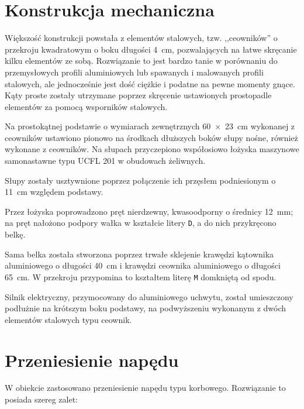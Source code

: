 \section{Konstrukcja mechaniczna}

Większość konstrukcji powstała z elementów stalowych, tzw. ,,ceowników'' o przekroju kwadratowym o boku długości \SI[mode=text]{4}{cm}, pozwalających na łatwe skręcanie kilku elementów ze sobą. Rozwiązanie to jest bardzo tanie w porównaniu do przemysłowych profili aluminiowych lub spawanych i malowanych profili stalowych, ale jednocześnie jest dość ciężkie i podatne na pewne momenty gnące. Kąty proste zostały utrzymane poprzez skręcenie ustawionych prostopadle elementów za pomocą wsporników stalowych.


Na prostokątnej podstawie o wymiarach zewnętrznych \SI[mode=text]{60 x 23}{cm} wykonanej z ceowników ustawiono pionowo na środkach dłuższych boków słupy nośne, również wykonane z ceowników. Na słupach przyczepiono współosiowo łożyska maszynowe samonastawne typu UCFL 201 w obudowach żeliwnych.

Słupy zostały usztywnione poprzez połączenie ich przęsłem podniesionym o \SI[mode=text]{11}{cm} względem podstawy.

Przez łożyska poprowadzono pręt nierdzewny, kwasoodporny o średnicy \SI[mode=text]{12}{mm}; na pręt nałożono podpory wałka w kształcie litery \texttt{D}, a do nich przykręcono belkę.

Sama belka została stworzona poprzez trwałe sklejenie krawędzi kątownika aluminiowego o długości \SI[mode=text]{40}{cm} i krawędzi ceownika aluminiowego o długości \SI[mode=text]{65}{cm}. W przekroju przypomina to kształtem literę \texttt{M} domkniętą od spodu.

Silnik elektryczny, przymocowany do aluminiowego uchwytu, został umieszczony podłużnie na krótszym boku podstawy, na podwyższeniu wykonanym z dwóch elementów stalowych typu ceownik.


\section{Przeniesienie napędu}

W obiekcie zastosowano przeniesienie napędu typu korbowego. Rozwiązanie to posiada szereg zalet:

